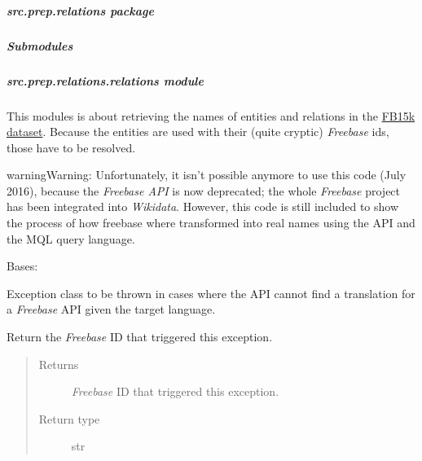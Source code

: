 \documentclass[letterpaper,10pt,english]{sphinxmanual}
\begin{document}
\subparagraph{src.prep.relations package}
\label{src.prep.relations:src-prep-relations-package}\label{src.prep.relations::doc}

\subparagraph{Submodules}
\label{src.prep.relations:submodules}

\subparagraph{src.prep.relations.relations module}
\label{src.prep.relations:src-prep-relations-relations-module}\label{src.prep.relations:module-src.prep.relations.relations}
This modules is about retrieving the names of entities and relations in the
\href{https://everest.hds.utc.fr/doku.php?id=en:smemlj12}{FB15k dataset}. Because the entities are
used with their (quite cryptic) \emph{Freebase} ids, those have to be resolved.

\begin{notice}{warning}{Warning:}
Unfortunately, it isn't possible anymore to use this code (July 2016), because the \emph{Freebase API} is now
deprecated; the whole \emph{Freebase} project has been integrated into \emph{Wikidata}. However, this code is still
included to show the process of how freebase where transformed into real names using the API and the MQL query
language.
\end{notice}

\begin{fulllineitems}
\label{src.prep.relations:src.prep.relations.relations.MissingTranslationException}
Bases: 

Exception class to be thrown in cases where the API cannot find a translation for a \emph{Freebase} API given the
target language.

\begin{fulllineitems}
\label{src.prep.relations:src.prep.relations.relations.MissingTranslationException.get_id}
Return the \emph{Freebase} ID that triggered this exception.
\begin{quote}\begin{description}
\item[{Returns}] \leavevmode
\emph{Freebase} ID that triggered this exception.

\item[{Return type}] \leavevmode
str

\end{description}\end{quote}

\end{fulllineitems}


\end{fulllineitems}
\end{document}
